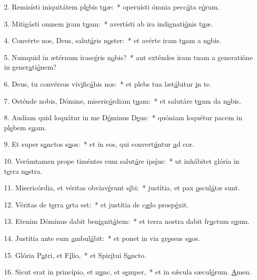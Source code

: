 2. Remisísti iniquitátem pl\uline{e}bis t\uline{u}æ:~* operuísti ómnia pecc\uline{á}ta e\uline{ó}rum.\par 
3. Mitigásti omnem \uline{i}ram t\uline{u}am:~* avertísti ab ira indignati\uline{ó}nis t\uline{u}æ.\par 
4. Convérte nos, Deus, salut\uline{á}ris n\uline{o}ster:~* et avérte iram t\uline{u}am a n\uline{o}bis.\par 
5. Numquid in ætérnum irasc\uline{é}ris n\uline{o}bis?~* aut exténdes iram tuam a generatióne in gener\uline{a}ti\uline{ó}nem?\par 
6. Deus, tu convérsus viv\uline{i}fic\uline{á}bis nos:~* et plebs tua læt\uline{á}bitur \uline{i}n te.\par 
7. Osténde nobis, Dómine, miseric\uline{ó}rdiam t\uline{u}am:~* et salutáre t\uline{u}um da n\uline{o}bis.\par 
8. Audiam quid loquátur in me D\uline{ó}minus D\uline{e}us:~* quóniam loquétur pacem in pl\uline{e}bem s\uline{u}am.\par 
9. Et super s\uline{a}nctos s\uline{u}os:~* et in eos, qui convert\uline{ú}ntur \uline{a}d cor.\par 
10. Verúmtamen prope timéntes eum salut\uline{á}re ips\uline{í}us:~* ut inhábitet glória in t\uline{e}rra n\uline{o}stra.\par 
11. Misericórdia, et véritas obviav\uline{é}runt s\uline{i}bi:~* justítia, et pax \uline{o}scul\uline{á}tæ sunt.\par 
12. Véritas de t\uline{e}rra \uline{o}rta est:~* et justítia de c\uline{æ}lo prosp\uline{é}xit.\par 
13. Etenim Dóminus dabit ben\uline{i}gnit\uline{á}tem:~* et terra nostra dabit fr\uline{u}ctum s\uline{u}um.\par 
14. Justítia ante eum \uline{a}mbul\uline{á}bit:~* et ponet in via gr\uline{e}ssus s\uline{u}os.\par 
15. Glória P\uline{a}tri, et F\uline{í}lio,~* et Spir\uline{í}tui S\uline{a}ncto.\par 
16. Sicut erat in princípio, et n\uline{u}nc, et s\uline{e}mper,~* et in sǽcula sæcul\uline{ó}rum. \uline{A}men.\par 
